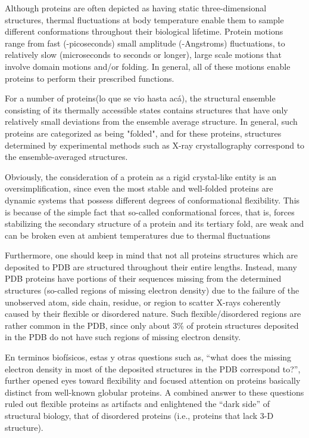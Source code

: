 
Although proteins are often depicted as having static three-dimensional structures, thermal fluctuations at body temperature enable them to sample different conformations
throughout their biological lifetime. Protein motions range from fast (-picoseconds) small amplitude (-Angstroms) fluctuations, to relatively slow (microseconds to seconds
or longer), large scale motions that involve domain motions and/or folding. In general, all of these motions enable proteins to perform their prescribed functions.

For a number of proteins(lo que se vio hasta acá), the structural ensemble consisting of its thermally accessible states contains structures that have only relatively small deviations from the ensemble
average structure. In general, such proteins are categorized as being "folded", and for these proteins, structures determined by experimental methods such as X-ray crystallography correspond to the ensemble-averaged structures.


Obviously, the consideration of a protein as a rigid crystal-like entity is an oversimplification, since even the most stable and well-folded proteins are dynamic systems that possess different degrees of conformational flexibility.
This is because of the simple fact that so-called conformational forces, that is, forces stabilizing the secondary structure of a protein and its tertiary fold, are weak and can be broken even at ambient temperatures due to thermal fluctuations


Furthermore, one should keep in mind that not all proteins structures which are deposited to PDB are structured throughout their entire lengths. 
Instead, many PDB proteins have portions of their sequences missing from the determined structures (so-called regions of missing electron density) due to the failure of the unobserved atom, side chain, residue, or region to scatter
X-rays coherently caused by their flexible or disordered nature. Such flexible/disordered regions are rather common in the PDB, since only about 3\% of
protein structures deposited in the PDB do not have such regions of missing electron density.

En terminos biofísicos, estas y otras questions such as, “what does the missing electron density in most of the deposited structures in the PDB correspond to?”, 
further opened eyes toward flexibility and focused attention on proteins basically distinct from well-known globular proteins. 
A combined answer to these questions ruled out flexible proteins as artifacts and enlightened the “dark side” of structural biology, that of disordered proteins (i.e., proteins that lack 3-D structure).


